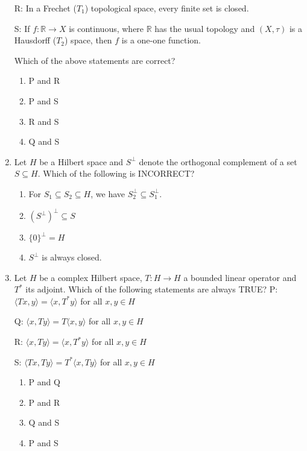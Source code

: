 \documentclass[journal]{IEEEtran}
\numberwithin{equation}{enumi}
\numberwithin{figure}{enumi}
\begin{document}
\begin{enumerate}
R: In a Frechet ($T_1$) topological space, every finite set is closed.

S: If $f: \mathbb{R} \to X$ is continuous, where $\mathbb{R}$ has the usual topology and $(X, \tau)$ is a Hausdorff ($T_2$) space, then $f$ is a one-one function.

Which of the above statements are correct?
\hfill{}
\begin{multicols}{2}
\begin{enumerate}
  \item P and R
  \item P and S
  \item R and S
  \item Q and S
\end{enumerate}
\end{multicols}

\item
Let $H$ be a Hilbert space and $S^\perp$ denote the orthogonal complement of a set $S \subseteq H$. Which of the following is INCORRECT?
\hfill{}
\begin{multicols}{2}
\begin{enumerate}
  \item For $S_1 \subseteq S_2 \subseteq H$, we have $S_2^\perp \subseteq S_1^\perp$.
  \item $(S^\perp)^\perp \subseteq S$
  \item $\{0\}^\perp = H$
  \item $S^\perp$ is always closed.
\end{enumerate}
\end{multicols}

\item
Let $H$ be a complex Hilbert space, $T: H \to H$ a bounded linear operator and $T^*$ its adjoint. Which of the following statements are always TRUE?
P: $\langle Tx, y \rangle = \langle x, T^*y \rangle$ for all $x, y \in H$

Q: $\langle x, Ty \rangle = T \langle x, y \rangle$ for all $x, y \in H$

R: $\langle x, Ty \rangle = \langle x, T^*y \rangle$ for all $x, y \in H$

S: $\langle Tx, Ty \rangle = T^* \langle x, Ty \rangle$ for all $x, y \in H$

\hfill{}
\begin{multicols}{2}
\begin{enumerate}
  \item P and Q
  \item P and R
  \item Q and S
  \item P and S
\end{enumerate}
\end{multicols}


\end{enumerate}
\end{document}

